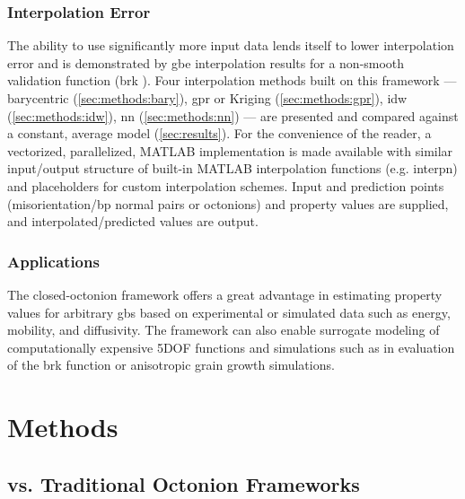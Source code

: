 \documentclass[preprint,12pt]{elsarticle}
\begin{document}
\subsubsection{Interpolation Error}
The ability to use significantly more input data lends itself to lower interpolation error and is demonstrated by \gls{gbe} interpolation results for a non-smooth validation function (\gls{brk} \cite{bulatovGrainBoundaryEnergy2014}).
Four interpolation methods built on this framework --- barycentric (\ref{sec:methods:bary}), \gls{gpr} or Kriging (\ref{sec:methods:gpr}), \gls{idw} (\ref{sec:methods:idw}), \gls{nn} (\ref{sec:methods:nn}) --- are presented and compared against a constant, average model (\ref{sec:results}). For the convenience of the reader, a vectorized, parallelized, MATLAB implementation is made available \cite{bairdFiveDegreeofFreedom5DOF2020} with similar input/output structure of built-in MATLAB interpolation functions (e.g. interpn) and placeholders for custom interpolation schemes. Input and prediction points (misorientation/\gls{bp} normal pairs or octonions) and property values are supplied, and interpolated/predicted values are output.

\subsubsection{Applications}

The closed-octonion framework offers a great advantage in estimating property values for arbitrary \glspl{gb} based on experimental or simulated data such as energy, mobility, and diffusivity. The framework can also enable surrogate modeling of computationally expensive 5DOF functions and simulations such as in evaluation of the \gls{brk} function or anisotropic grain growth simulations.

\section{Methods} \label{sec:methods}

\subsection{ vs. Traditional Octonion Frameworks} \label{sec:methods:closed-mesh-comparison}
\end{document}
